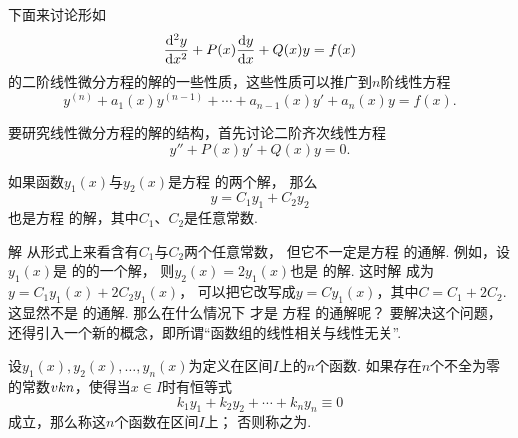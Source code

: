 下面来讨论形如
\begin{equation}\label{equation:微分方程.二阶非齐次线性微分方程的一般形式}
\dv[2]{y}{x} + P(x) \dv{y}{x} + Q(x) y = f(x)
\end{equation}
的二阶线性微分方程的解的一些性质，这些性质可以推广到\(n\)阶线性方程
\begin{equation}\label{equation:微分方程.n阶线性微分方程的一般形式}
y^{(n)} + a_1(x) y^{(n-1)} + \dotsb + a_{n-1}(x) y' + a_n(x) y = f(x).
\end{equation}

要研究线性微分方程的解的结构，首先讨论二阶齐次线性方程\begin{equation}\label{equation:微分方程.二阶齐次线性微分方程的一般形式}
y'' + P(x) y' + Q(x) y = 0.
\end{equation}

\begin{theorem}
如果函数\(y_1(x)\)与\(y_2(x)\)是方程  的两个解，%
那么
\begin{equation}\label{equation:微分方程.二阶齐次线性微分方程的通解的结构}
y = C_1 y_1 + C_2 y_2
\end{equation}
也是方程  的解，其中\(C_1\)、\(C_2\)是任意常数.
\end{theorem}

解  从形式上来看含有\(C_1\)与\(C_2\)两个任意常数，%
但它不一定是方程  的通解.
例如，设\(y_1(x)\)是  的的一个解，%
则\(y_2(x)=2 y_1(x)\)也是  的解.
这时解  成为\(y = C_1 y_1(x) + 2 C_2 y_1(x)\)，%
可以把它改写成\(y = C y_1(x)\)，其中\(C = C_1 + 2 C_2\).
这显然不是  的通解.
那么在什么情况下  才是%
方程  的通解呢？
要解决这个问题，还得引入一个新的概念，即所谓“函数组的线性相关与线性无关”.

\begin{definition}
设\(y_1(x),y_2(x),\dotsc,y_n(x)\)为定义在区间\(I\)上的\(n\)个函数.
如果存在\(n\)个不全为零的常数\(v{k}{n}\)，使得当\(x \in I\)时有恒等式\[
k_1 y_1+k_2 y_2+ \dotsb +k_n y_n \equiv 0
\]成立，那么称这\(n\)个函数在区间\(I\)上；
否则称之为.
\end{definition}

